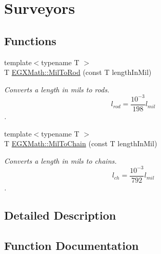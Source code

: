 \hypertarget{group___e_g_x_math-_conversions-_length_conversions-_imperial-_mil-_surveyors}{}\section{Surveyors}
\label{group___e_g_x_math-_conversions-_length_conversions-_imperial-_mil-_surveyors}
\subsection*{Functions}
\begin{DoxyCompactItemize}
\item 
{\footnotesize template$<$typename T $>$ }\\T \mbox{\hyperlink{group___e_g_x_math-_conversions-_length_conversions-_imperial-_mil-_surveyors_gae5721b0cf84304ecfade5a7808814329}{E\+G\+X\+Math\+::\+Mil\+To\+Rod}} (const T length\+In\+Mil)
\begin{DoxyCompactList}\small\item\em Converts a length in mils to rods. \[ l_{rod}= \frac{10^{-3}}{198} l_{mil} \]. \end{DoxyCompactList}\item 
{\footnotesize template$<$typename T $>$ }\\T \mbox{\hyperlink{group___e_g_x_math-_conversions-_length_conversions-_imperial-_mil-_surveyors_gac2207a6f05f3d2e7dfec2eade3fdf431}{E\+G\+X\+Math\+::\+Mil\+To\+Chain}} (const T length\+In\+Mil)
\begin{DoxyCompactList}\small\item\em Converts a length in mils to chains. \[ l_{ch}= \frac{10^{-3}}{792} l_{mil} \]. \end{DoxyCompactList}\end{DoxyCompactItemize}


\subsection{Detailed Description}


\subsection{Function Documentation}
\mbox{\label{group___e_g_x_math-_conversions-_length_conversions-_imperial-_mil-_surveyors_gac2207a6f05f3d2e7dfec2eade3fdf431}} 
